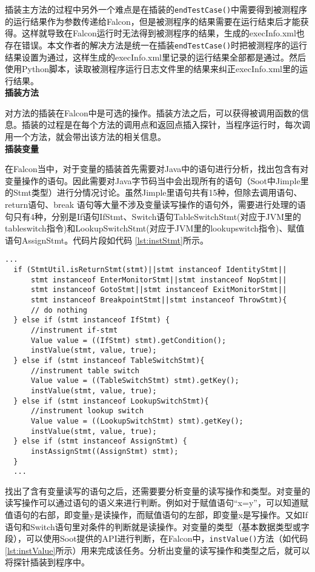 插装主方法的过程中另外一个难点是在插装的\texttt{endTestCase()}中需要得到被测程序的运行结果作为参数传递给Falcon，但是被测程序的结果需要在运行结束后才能获得。这样就导致在Falcon运行时无法得到被测程序的结果，生成的execInfo.xml也存在错误。本文作者的解决方法是统一在插装\texttt{endTestCase()}时把被测程序的运行结果设置为通过，这样生成的execInfo.xml里记录的运行结果全部都是通过。然后使用Python脚本，读取被测程序运行日志文件里的结果来纠正execInfo.xml里的运行结果。\\
\textbf{插装方法}\par
对方法的插装在Falcon中是可选的操作。插装方法之后，可以获得被调用函数的信息。插装的过程是在每个方法的调用点和返回点插入探针，当程序运行时，每次调用一个方法，就会带出该方法的相关信息。\\
\textbf{插装变量}\par
在Falcon当中，对于变量的插装首先需要对Java中的语句进行分析，找出包含有对变量操作的语句。因此需要对Java字节码当中会出现所有的语句（Soot中Jimple里的Stmt类型）进行分情况讨论。虽然Jimple里语句共有15种，但除去调用语句、return语句、break 语句等大量不涉及变量读写操作的语句外，需要进行处理的语句只有4种，分别是If语句IfStmt、Switch语句TableSwitchStmt(对应于JVM里的tableswitch指令)和LookupSwitchStmt(对应于JVM里的lookupswitch指令)、赋值语句AssignStmt。代码片段如代码
\ref{lst:instStmt}所示。
\begin{lstlisting}[language={[AspectJ]Java}, label=lst:instStmt, caption=对不同的Stmt进行处理]
  ...
  if (StmtUtil.isReturnStmt(stmt)||stmt instanceof IdentityStmt||
      stmt instanceof EnterMonitorStmt||stmt instanceof NopStmt||
      stmt instanceof GotoStmt||stmt instanceof ExitMonitorStmt||
      stmt instanceof BreakpointStmt||stmt instanceof ThrowStmt){
      // do nothing
  } else if (stmt instanceof IfStmt) {
      //instrument if-stmt
      Value value = ((IfStmt) stmt).getCondition();
      instValue(stmt, value, true);
  } else if (stmt instanceof TableSwitchStmt){
      //instrument table switch
      Value value = ((TableSwitchStmt) stmt).getKey();
      instValue(stmt, value, true);
  } else if (stmt instanceof LookupSwitchStmt){
      //instrument lookup switch
      Value value = ((LookupSwitchStmt) stmt).getKey();
      instValue(stmt, value, true);
  } else if (stmt instanceof AssignStmt) {
      instAssignStmt((AssignStmt) stmt);
  }
  ...
\end{lstlisting}\par
找出了含有变量读写的语句之后，还需要要分析变量的读写操作和类型。对变量的读写操作可以通过语句的语义来进行判断。例如对于赋值语句“x=y”，可以知道赋值语句的右部，即变量y是读操作，而赋值语句的左部，即变量x是写操作。又如If语句和Switch语句里对条件的判断就是读操作。对变量的类型（基本数据类型或字段），可以使用Soot提供的API进行判断，在Falcon中，\texttt{instValue()}方法（如代码\ref{lst:instValue}所示）用来完成该任务。分析出变量的读写操作和类型之后，就可以将探针插装到程序中。\\

